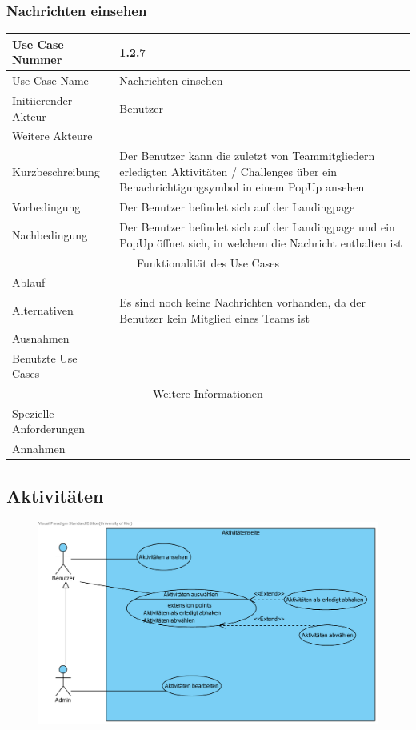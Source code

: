 \documentclass[10pt,a4paper]{article}
\begin{document}
		\subsubsection{Nachrichten einsehen}
		\begin{tabularx}{\textwidth}{|l|X|}
			\hline Use Case Nummer & 1.2.7 \\ 
			\hline Use Case Name & Nachrichten einsehen \\ 
			\hline Initiierender Akteur & Benutzer \\
			\hline Weitere Akteure & \\
			\hline Kurzbeschreibung & Der Benutzer kann die zuletzt von Teammitgliedern erledigten Aktivitäten / Challenges über ein Benachrichtigungsymbol in einem PopUp ansehen \\
			\hline Vorbedingung & Der Benutzer befindet sich auf der Landingpage \\
			\hline Nachbedingung & Der Benutzer befindet sich auf der Landingpage und ein PopUp öffnet sich, in welchem die Nachricht enthalten ist \\ %
			\hline \multicolumn{2}{|c|}{Funktionalität des Use Cases}\\
			\hline Ablauf & \\
			\hline Alternativen & Es sind noch keine Nachrichten vorhanden, da der Benutzer kein Mitglied eines Teams ist \\
			\hline Ausnahmen & \\
			\hline Benutzte Use Cases & \\
			\hline \multicolumn{2}{|c|}{Weitere Informationen} \\
			\hline Spezielle Anforderungen & \\
			\hline Annahmen & \\
			\hline
		\end{tabularx}
\subsection{Aktivit\"aten}

	\begin{figure}[H]
		\includegraphics[width=\linewidth]{gfx/webseite/Aktivitaetenseite.pdf}
	\end{figure}
\end{document}
